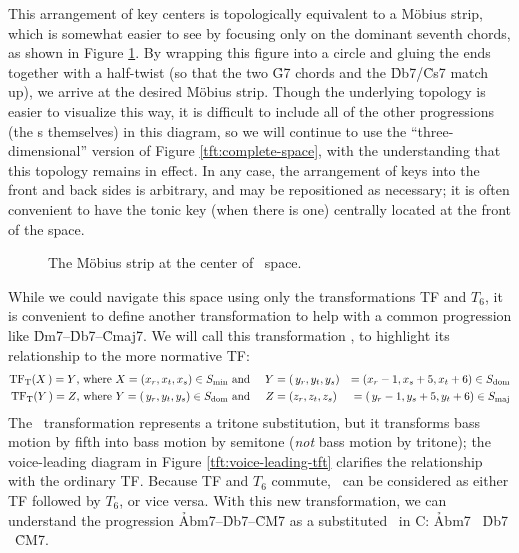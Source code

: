 This arrangement of key centers is topologically equivalent to a Möbius strip,
which is somewhat easier to see by focusing only on the dominant seventh
chords, as shown in Figure \ref{tft:mobius-dominants}. By wrapping this figure
into a circle and gluing the ends together with a half-twist (so that the two
\h{G7} chords and the \h{Db7}/\h{Cs7} match up), we arrive at the desired Möbius strip. Though
the underlying topology is easier to visualize this way, it is difficult to
include all of the other progressions (the \tf{}s themselves) in this diagram,
so we will continue to use the ``three-dimensional'' version of Figure
\ref{tft:complete-space}, with the understanding that this topology remains in
effect. In any case, the arrangement of keys into the front and back sides is
arbitrary, and may be repositioned as necessary; it is often convenient to
have the tonic key (when there is one) centrally located at the front of the
space.

\begin{figure}[htbp]
  \caption{The Möbius strip at the center of \tf\ space.}
  \label{tft:mobius-dominants}
\end{figure}

While we could navigate this space using only the transformations TF and
$T_6$, it is convenient to define another transformation to help with a common
progression like \h{Dm7}--\h{Db7}--\h{Cmaj7}. We will call this
transformation \tft, to highlight its relationship to the more normative TF:%
%
\begin{alignat*}{3}
    \mathrm{TF}_\mathrm{T}(X\,) = Y\text{, where}\ X = (x_r, x_t, x_s) \in S_{\mathrm{min}}
    & \text{ and}\ &
    Y &= (\,y_r, y_t, y_s) &= (x_r - 1, x_s + 5, x_t + 6) \in S_{\mathrm{dom}} \\
    \mathrm{TF}_\mathrm{T}(Y\,) = Z\text{, where}\ Y = (\,y_r, y_t, y_s) \in S_{\mathrm{dom}}
    & \text{ and} &
    Z &= (z_r, z_t, z_s) &= (\,y_r - 1, y_s + 5, y_t + 6) \in S_{\mathrm{maj}}
\end{alignat*}%
%
The \tft\ transformation represents a tritone substitution, but it
transforms bass motion by fifth into bass motion by semitone (\emph{not} bass
motion by tritone); the voice-leading diagram in Figure
\ref{tft:voice-leading-tft} clarifies the relationship with the ordinary TF. Because TF and $T_6$ commute,
\tft\ can be considered as either TF followed by $T_6$, or vice versa. With
this new transformation, we can understand the progression
\h{Abm7}--\h{Db7}--\h{CM7} as a substituted \tfo\ in C: \h{Abm7} \TFarrow\
\h{Db7} \TFTarrow\ \h{CM7}.


